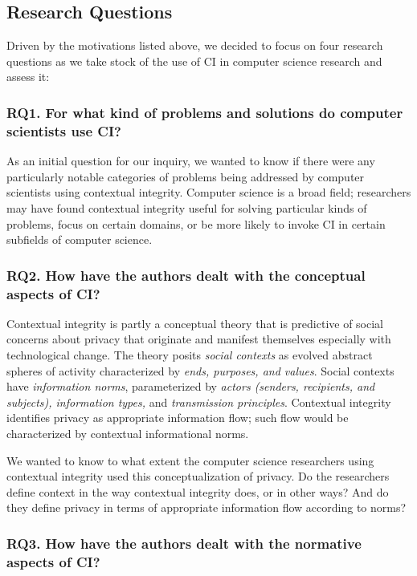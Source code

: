 \documentclass[../thesis.tex]{subfiles}
\begin{document}
\subsection{Research Questions}
\label{CI3.1}

Driven by the motivations listed above, we
decided to focus on four research questions as we take stock of the
use of CI in computer science research and assess it:

\subsubsection{RQ1. For what kind of problems and solutions do computer scientists use CI?}

As an initial question for our inquiry, we wanted to know if there were
any particularly notable categories of problems being addressed by
computer scientists using contextual integrity. Computer science is a
broad field; researchers may have found contextual integrity useful for
solving particular kinds of problems, focus on certain domains, or be
more likely to invoke CI in certain subfields of computer science.

\subsubsection{RQ2. How have the authors dealt with the conceptual aspects of CI?}

Contextual integrity is partly a conceptual theory that is predictive of
social concerns about privacy that originate and manifest themselves
especially with technological change. The theory posits \textit{social
contexts} as evolved abstract spheres of activity characterized by
\textit{ends, purposes, and values}. Social contexts have
\textit{information norms}, parameterized by \textit{actors (senders,
recipients, and subjects), information types, }and\textit{ transmission
principles}. Contextual integrity identifies privacy as appropriate
information flow; such flow would be characterized by contextual
informational norms.

We wanted to know to what extent the computer science researchers using
contextual integrity used this conceptualization of privacy. Do the
researchers define context in the way contextual integrity does, or in
other ways? And do they define privacy in terms of appropriate
information flow according to norms?

\subsubsection{RQ3. How have the authors dealt with the normative aspects of CI?}
\end{document}
